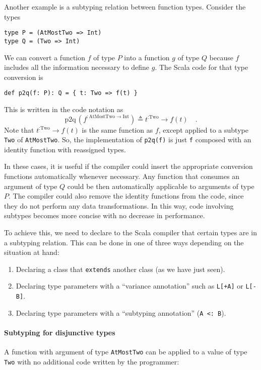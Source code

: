 Another example is a subtyping relation between function types. Consider
the types
\begin{lstlisting}
type P = (AtMostTwo => Int)
type Q = (Two => Int)
\end{lstlisting}
We can convert a function $f$ of type $P$ into a function $g$ of
type $Q$ because $f$ includes all the information necessary to define
$g$. The Scala code for that type conversion is
\begin{lstlisting}
def p2q(f: P): Q = { t: Two => f(t) }
\end{lstlisting}
This is written in the code notation as
\[
\text{p2q}\,(f^{:\text{AtMostTwo}\rightarrow\text{Int}})\triangleq t^{:\text{Two}}\rightarrow f(t)\quad.
\]
Note that $t^{:\text{Two}}\rightarrow f(t)$ is the same function
as $f$, except applied to a subtype \lstinline!Two! of \lstinline!AtMostTwo!.
So, the implementation of \lstinline!p2q(f)! is just \lstinline!f!
composed with an identity function with reassigned types.

In these cases, it is useful if the compiler could insert the appropriate
conversion functions automatically whenever necessary. Any function
that consumes an argument of type $Q$ could be then automatically
applicable to arguments of type $P$. The compiler could also remove
the identity functions from the code, since they do not perform any
data transformations. In this way, code involving subtypes becomes
more concise with no decrease in performance.

To achieve this, we need to declare to the Scala compiler that certain
types are in a subtyping relation. This can be done in one of three
ways depending on the situation at hand:
\begin{enumerate}
\item Declaring a class that \lstinline!extends! another class (as we have
just seen).
\item Declaring type parameters with a \textsf{``}variance annotation\textsf{''} such as
\lstinline!L[+A]! or \lstinline!L[-B]!.
\item Declaring type parameters with a \textsf{``}subtyping annotation\textsf{''} (\lstinline!A <: B!).
\end{enumerate}

\paragraph{Subtyping for disjunctive types }

A function with argument of type \lstinline!AtMostTwo! can be applied
to a value of type \lstinline!Two! with no additional code written
by the programmer:

